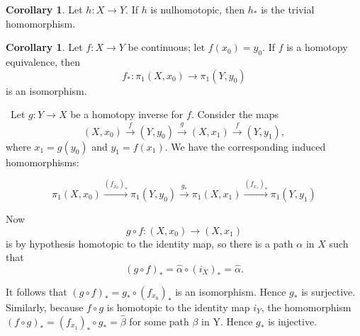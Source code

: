 \documentclass[12pt,a4paper]{book}
\newenvironment{prooff}{{\noindent\it\textcolor{cyan!40!black}{Proof}:}\,}{\par}
\theoremstyle{definition}
\newtheorem{coro}[defn]{Corollary}
\begin{document}
\begin{coro}
    Let $h: X \rightarrow Y$. If $h$ is nulhomotopic, then $h_*$ is the trivial homomorphism.
\end{coro}
\begin{coro}
    Let $f: X \rightarrow Y$ be continuous; let $f\left(x_0\right)=y_0$. If $f$ is a homotopy equivalence, then
    $$
        f_*: \pi_1\left(X, x_0\right) \longrightarrow \pi_1\left(Y, y_0\right)
    $$
    is an isomorphism.
\end{coro}
\begin{prooff}
    Let $g: Y \rightarrow X$ be a homotopy inverse for $f$. Consider the maps
    $$
        \left(X, x_0\right) \xrightarrow{f}\left(Y, y_0\right) \xrightarrow{g}\left(X, x_1\right) \xrightarrow{f}\left(Y, y_1\right),
    $$
    where $x_1=g\left(y_0\right)$ and $y_1=f\left(x_1\right)$. We have the corresponding induced homomorphisms:

    $$
        \pi_1\left(X, x_0\right) \xrightarrow{\left(f_{x_0}\right)_*} \pi_1\left(Y, y_0\right)\xrightarrow{g_*}  \pi_1\left(X, x_1\right) \xrightarrow{\left(f_{x_1}\right)_*} \pi_1\left(Y, y_1\right)
    $$

    Now
    $$
        g \circ f:\left(X, x_0\right) \longrightarrow\left(X, x_1\right)
    $$
    is by hypothesis homotopic to the identity map, so there is a path $\alpha$ in $X$ such that
    $$
        (g \circ f)_*=\hat{\alpha} \circ\left(i_X\right)_*=\hat{\alpha} .
    $$

    It follows that $(g \circ f)_*=g_* \circ\left(f_{x_0}\right)_*$ is an isomorphism. Hence $g_*$ is surjective.
    Similarly, because $f \circ g$ is homotopic to the identity map $i_Y$, the homomorphism $(f \circ g)_*=\left(f_{x_1}\right)_* \circ g_*=\hat{\beta}$ for some path $\beta$ in Y. Hence $g_*$ is injective.

\end{prooff}
\end{document}
